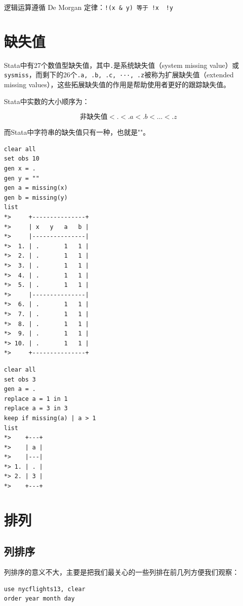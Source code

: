 \documentclass[]{ctexbook}
\begin{document}
逻辑运算遵循 De Morgan 定律：\texttt{!(x\ \&\ y)\ 等于\ !x\ \textbar{}\ !y}

\hypertarget{section-43}{%
\section{缺失值}\label{section-43}}

Stata中有27个数值型缺失值，其中\texttt{.}是系统缺失值（system missing value）或\texttt{sysmiss}，而剩下的26个\texttt{.a,\ .b,\ .c,\ ···,\ .z}被称为扩展缺失值（extended missing values），这些拓展缺失值的作用是帮助使用者更好的跟踪缺失值。

Stata中实数的大小顺序为：

\[
非缺失值 < . < .a < .b <  ...  < .z
\]

而Stata中字符串的缺失值只有一种，也就是""。

\begin{lstlisting}
clear all
set obs 10
gen x = .
gen y = ""
gen a = missing(x)
gen b = missing(y)
list
*>     +---------------+
*>     | x   y   a   b |
*>     |---------------|
*>  1. | .       1   1 |
*>  2. | .       1   1 |
*>  3. | .       1   1 |
*>  4. | .       1   1 |
*>  5. | .       1   1 |
*>     |---------------|
*>  6. | .       1   1 |
*>  7. | .       1   1 |
*>  8. | .       1   1 |
*>  9. | .       1   1 |
*> 10. | .       1   1 |
*>     +---------------+
\end{lstlisting}

\begin{lstlisting}
clear all
set obs 3
gen a = .
replace a = 1 in 1
replace a = 3 in 3
keep if missing(a) | a > 1
list
*>    +---+
*>    | a |
*>    |---|
*> 1. | . |
*> 2. | 3 |
*>    +---+
\end{lstlisting}

\hypertarget{section-44}{%
\section{排列}\label{section-44}}

\hypertarget{section-45}{%
\subsection{列排序}\label{section-45}}

列排序的意义不大，主要是把我们最关心的一些列排在前几列方便我们观察：

\begin{lstlisting}
use nycflights13, clear
order year month day
\end{lstlisting}
\end{document}
